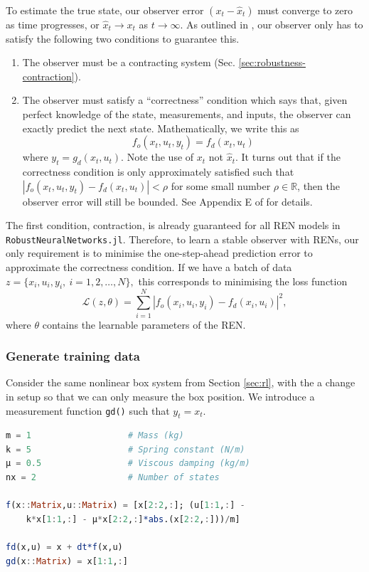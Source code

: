 To estimate the true state, our observer error $(x_t - \hat{x}_t)$ must converge to zero as time progresses, or $\hat{x}_t \rightarrow x_t$ as $t \rightarrow \infty$. As outlined in \cite{Revay++2023}, our observer only has to satisfy the following two conditions to guarantee this.

\begin{enumerate}
    \item The observer must be a contracting system (Sec. \ref{sec:robustness-contraction}).
    \item The observer must satisfy a ``correctness'' condition which says that, given perfect knowledge of the state, measurements, and inputs, the observer can exactly predict the next state. Mathematically, we write this as
    \begin{equation}
        f_o(x_t,u_t,y_t) = f_d(x_t,u_t)
    \end{equation}
    where $y_t = g_d(x_t,u_t)$. Note the use of $x_t$ not $\hat{x}_t$. It turns out that if the correctness condition is only approximately satisfied such that $|f_o(x_t,u_t,y_t) - f_d(x_t,u_t)| < \rho$ for some small number $\rho\in\mathbb{R}$, then the observer error will still be bounded. See Appendix E of \cite{Revay++2023} for details.
\end{enumerate}

The first condition, contraction, is already guaranteed for all REN models in \verb|RobustNeuralNetworks.jl|. Therefore, to learn a stable observer with RENs, our only requirement is to minimise the one-step-ahead prediction error to approximate the correctness condition. If we have a batch of data $z = \{x_i, u_i, y_i, \ i = 1,2,\ldots,N\},$ this corresponds to minimising the loss function
\begin{equation}
\mathcal{L}(z, \theta) = \sum_{i=1}^N |f_o(x_i,u_i,y_i) - f_d(x_i,u_i)|^2,
\end{equation}
where $\theta$ contains the learnable parameters of the REN.

\subsubsection{Generate training data} \label{sec:observer-setup}

Consider the same nonlinear box system from Section \ref{sec:rl}, with the a change in setup so that we can only measure the box position. We introduce a measurement function \verb|gd()| such that $y_t = x_t$.

\begin{lstlisting}[language = Julia]
m = 1                   # Mass (kg)
k = 5                   # Spring constant (N/m)
μ = 0.5                 # Viscous damping (kg/m)
nx = 2                  # Number of states

f(x::Matrix,u::Matrix) = [x[2:2,:]; (u[1:1,:] - 
    k*x[1:1,:] - μ*x[2:2,:]*abs.(x[2:2,:]))/m]

fd(x,u) = x + dt*f(x,u)
gd(x::Matrix) = x[1:1,:]
\end{lstlisting}

